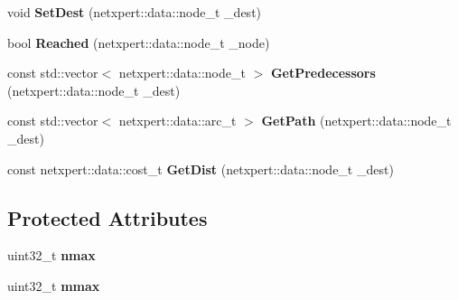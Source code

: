 \begin{DoxyCompactItemize}
\item 
void {\bfseries Set\+Dest} (netxpert\+::data\+::node\+\_\+t \+\_\+dest)\hypertarget{classnetxpert_1_1core_1_1SPT__LEM_a94de1da6ae4cc62cfb92d08b9f005912}{}\label{classnetxpert_1_1core_1_1SPT__LEM_a94de1da6ae4cc62cfb92d08b9f005912}

\item 
bool {\bfseries Reached} (netxpert\+::data\+::node\+\_\+t \+\_\+node)\hypertarget{classnetxpert_1_1core_1_1SPT__LEM_a13157e4e557cb7c8a4491855af49350b}{}\label{classnetxpert_1_1core_1_1SPT__LEM_a13157e4e557cb7c8a4491855af49350b}

\item 
const std\+::vector$<$ netxpert\+::data\+::node\+\_\+t $>$ {\bfseries Get\+Predecessors} (netxpert\+::data\+::node\+\_\+t \+\_\+dest)\hypertarget{classnetxpert_1_1core_1_1SPT__LEM_a86a2fd01219e9050743a704e932b1705}{}\label{classnetxpert_1_1core_1_1SPT__LEM_a86a2fd01219e9050743a704e932b1705}

\item 
const std\+::vector$<$ netxpert\+::data\+::arc\+\_\+t $>$ {\bfseries Get\+Path} (netxpert\+::data\+::node\+\_\+t \+\_\+dest)\hypertarget{classnetxpert_1_1core_1_1SPT__LEM_a716f3ddb0319ce581c903020d14a59db}{}\label{classnetxpert_1_1core_1_1SPT__LEM_a716f3ddb0319ce581c903020d14a59db}

\item 
const netxpert\+::data\+::cost\+\_\+t {\bfseries Get\+Dist} (netxpert\+::data\+::node\+\_\+t \+\_\+dest)\hypertarget{classnetxpert_1_1core_1_1SPT__LEM_a5b090847e90271c3dbc8215e37f642a7}{}\label{classnetxpert_1_1core_1_1SPT__LEM_a5b090847e90271c3dbc8215e37f642a7}

\end{DoxyCompactItemize}
\subsection*{Protected Attributes}
\begin{DoxyCompactItemize}
\item 
uint32\+\_\+t {\bfseries nmax}\hypertarget{classnetxpert_1_1core_1_1SPT__LEM_a8ded380546a1da7734d9ce23010a1cd9}{}\label{classnetxpert_1_1core_1_1SPT__LEM_a8ded380546a1da7734d9ce23010a1cd9}

\item 
uint32\+\_\+t {\bfseries mmax}\hypertarget{classnetxpert_1_1core_1_1SPT__LEM_a6ea75eb48f7f45bd19c4d126099e5dd9}{}\label{classnetxpert_1_1core_1_1SPT__LEM_a6ea75eb48f7f45bd19c4d126099e5dd9}

\end{DoxyCompactItemize}



